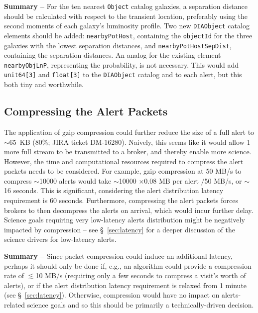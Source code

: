 \documentclass[DM,lsstdraft,authoryear,toc]{lsstdoc}
\begin{document}
{\bf Summary --} For the ten nearest {\tt Object} catalog galaxies, a separation distance should be calculated with respect to the transient location, preferably using the second moments of each galaxy's luminosity profile. Two new {\tt DIAObject} catalog elements should be added: {\tt nearbyPotHost}, containing the {\tt objectId} for the three galaxies with the lowest separation distances, and {\tt nearbyPotHostSepDist}, containing the separation distances. An analog for the existing element {\tt nearbyObjLnP}, representing the probability, is not necessary. This would add {\tt unit64[3]} and {\tt float[3]} to the {\tt DIAObject} catalog and to each alert, but this both tiny and worthwhile.


\subsection{Compressing the Alert Packets}\label{ssec:packets_compress}

The application of gzip compression could further reduce the size of a full alert to $\sim$65~KB (80\%; JIRA ticket DM-16280).
Naively, this seems like it would allow 1 more full stream to be transmitted to a broker, and thereby enable more science.
However, the time and computational resources required to compress the alert packets needs to be considered.
For example, gzip compression at 50 MB/s to compress $\sim$10000 alerts would take $\sim$10000 $\times$0.08 MB per alert $/$50 MB/s, or $\sim$16 seconds.
This is significant, considering the alert distribution latency requirement is 60 seconds. 
Furthermore, compressing the alert packets forces brokers to then decompress the alerts on arrival, which would incur further delay.
Science goals requiring very low-latency alerts distribution might be negatively impacted by compression -- see \S~\ref{sec:latency} for a deeper discussion of the science drivers for low-latency alerts.

{\bf Summary --} Since packet compression could induce an additional latency, perhaps it should only be done if, e.g., an algorithm could provide a compression rate of $\lesssim$10 MB/s (requiring only a few seconds to compress a visit's worth of alerts), or if the alert distribution latency requirement is relaxed from 1 minute (see \S~\ref{sec:latency}).
Otherwise, compression would have no impact on alerts-related science goals and so this should be primarily a technically-driven decision.
\end{document}
